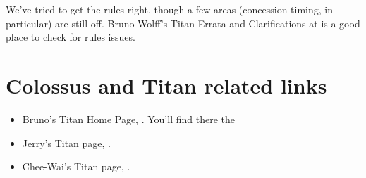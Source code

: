 \documentclass{article}
\begin{document}
We've tried to get the rules right, though a few areas (concession timing,
in particular) are still off. Bruno Wolff's Titan Errata and Clarifications at
is a good place to check for rules issues.

\section{Colossus and Titan related links}

\begin{itemize}

\item Bruno's Titan Home Page,
.
You'll find there the

\item Jerry's Titan page,
.

\item Chee-Wai's Titan page,
.

\end{itemize}
\end{document}

